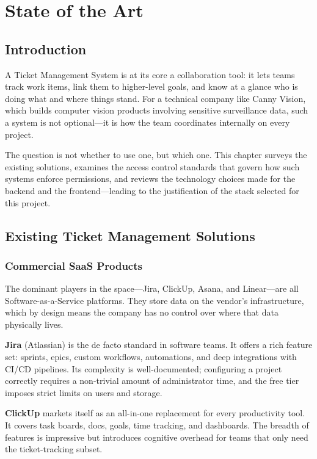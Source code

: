 \chapter{State of the Art}

\section{Introduction}

A Ticket Management System is at its core a collaboration tool: it lets teams track work items, link them to higher-level goals, and know at a glance who is doing what and where things stand. For a technical company like Canny Vision, which builds computer vision products involving sensitive surveillance data, such a system is not optional—it is how the team coordinates internally on every project.

The question is not whether to use one, but which one. This chapter surveys the existing solutions, examines the access control standards that govern how such systems enforce permissions, and reviews the technology choices made for the backend and the frontend—leading to the justification of the stack selected for this project.

\section{Existing Ticket Management Solutions}

\subsection{Commercial SaaS Products}

The dominant players in the space—Jira, ClickUp, Asana, and Linear—are all Software-as-a-Service platforms. They store data on the vendor's infrastructure, which by design means the company has no control over where that data physically lives.

\textbf{Jira} (Atlassian) is the de facto standard in software teams. It offers a rich feature set: sprints, epics, custom workflows, automations, and deep integrations with CI/CD pipelines. Its complexity is well-documented; configuring a project correctly requires a non-trivial amount of administrator time, and the free tier imposes strict limits on users and storage.

\textbf{ClickUp} markets itself as an all-in-one replacement for every productivity tool. It covers task boards, docs, goals, time tracking, and dashboards. The breadth of features is impressive but introduces cognitive overhead for teams that only need the ticket-tracking subset.

